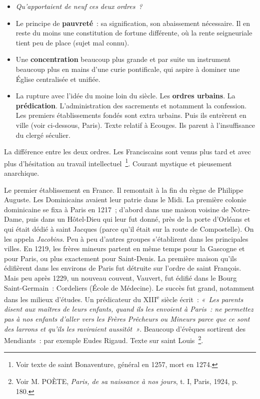 \documentclass[french,twoside]{book} %
\newlength{\listmod}
\newcommand{\listhead}[1]{\hspace{-1\listmod}\emph{#1}}
\begin{document}
\begin{itemize}[itemsep=0pt,]
\item[]\listhead{Qu’apportaient de neuf ces deux ordres ?}
\item Le principe de \textbf{pauvreté} : sa signification, son abaissement nécessaire. Il en reste du moins une constitution de fortune différente, où la rente seigneuriale tient peu de place (sujet mal connu).
\item Une \textbf{concentration} beaucoup plus grande et par suite un instrument beaucoup plus en mains d’une curie pontificale, qui aspire à dominer une Église centralisée et unifiée.
\item La rupture avec l’idée du moine loin du siècle. Les \textbf{ordres urbains}. La \textbf{prédication}. L’administration des sacrements et notamment la confession. Les premiers établissements fondés sont extra urbains. Puis ils entrèrent en ville (voir ci-dessous, Paris). Texte relatif à Ecouges. Ils parent à l’insuffisance du clergé séculier.
\end{itemize}

\noindent La différence entre les deux ordres. Les Franciscains sont venus plus tard et avec plus d’hésitation au travail intellectuel \footnote{Voir texte de saint Bonaventure, général en 1257, mort en 1274.}. Courant mystique et pieusement anarchique.\par
Le premier établissement en France. Il remontait à la fin du règne de Philippe Auguste. Les Dominicains avaient leur patrie dans le Midi. La première colonie dominicaine se fixa à Paris en 1217 ; d’abord dans une maison voisine de Notre-Dame, puis dans un Hôtel-Dieu qui leur fut donné, près de la porte d’Orléans et qui était dédié à saint Jacques (parce qu’il était sur la route de Compostelle). On les appela \emph{Jacobins}. Peu à peu d’autres groupes s’établirent dans les principales villes. En 1219, les frères mineurs partent en même temps pour la Gascogne et pour Paris, ou plus exactement pour Saint-Denis. La première maison qu’ils édifièrent dans les environs de Paris fut détruite sur l’ordre de saint François. Mais peu après 1229, un nouveau couvent, Vauvert, fut édifié dans le Bourg Saint-Germain : Cordeliers (École de Médecine). Le succès fut grand, notamment dans les milieux d’études. Un prédicateur du XIII\textsuperscript{e} siècle écrit : \emph{« Les parents disent aux maîtres de leurs enfants, quand ils les envoient à Paris : ne permettez pas à nos enfants d’aller vers les Frères Prêcheurs ou Mineurs parce que ce sont des larrons et qu’ils les raviraient aussitôt »}. Beaucoup d’évêques sortirent des Mendiants : par exemple Eudes Rigaud. Texte sur saint Louis \footnote{ Voir M. POÈTE, {\itshape Paris, de sa naissance à nos jours}, t. I, Paris, 1924, p. 180.}.\par
\end{document}
